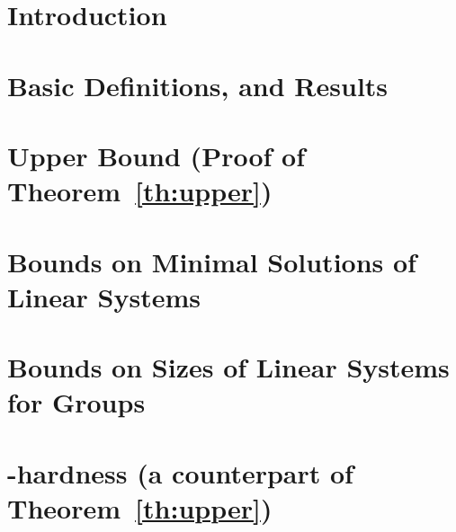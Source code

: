 \documentclass{lmcs} %
\begin{document}
\begin{abstract}
  \noindent We show that the EXPSPACE-hardness result for
	structural liveness of Petri nets [Jan\v{c}ar and
	Purser, 2019] holds even for a~simple subclass of
	conservative nets. As our main result, we prove that
	for structurally live conservative nets, the values of the
	minimal live markings are at most doubly exponential in the
	size of the net. This implies the EXPSPACE-completeness
	of structural liveness for conservative Petri nets. 
	The result also applies to structurally bounded Petri nets,
	whereas
the complexity of the general case remains open. 

As a proof ingredient of independent interest, we present an extension of known results on the bounds of minimal integer solutions to Boolean combinations of linear equalities, inequalities, and divisibility constraints.
\end{abstract}

\maketitle

\section{Introduction}

\section{Basic Definitions, and Results}\label{sec:basicdef}

\section{Upper Bound (Proof of Theorem~\ref{th:upper})}\label{sec:upperbound}

\section{Bounds on Minimal Solutions of Linear Systems}\label{sec:smallsolutions}

\section{Bounds on Sizes of Linear Systems for Groups}\label{sec:virtual}

\section{\EXPSPACE-hardness 
(a counterpart of Theorem~\ref{th:upper})}\label{sec:hardness}




\end{document}
